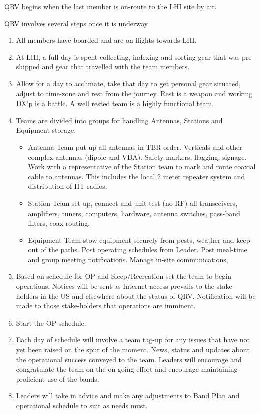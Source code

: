 \documentclass[11pt]{article}
\begin{document}
QRV begins when the last member is on-route to the LHI site by air.
\par
QRV involves several steps once it is underway
\begin{enumerate}
\item All members have boarded and are on flights towards LHI.
\item At LHI, a full day is spent collecting, indexing and sorting
gear that was pre-shipped and gear that travelled with the team members.
\item Allow for a day to acclimate, take that day to get personal gear
situated, adjust to time-zone and rest from the journey.  Rest is a weapon
and working DX'p is a battle. A well rested team is a highly functional team.
\item Teams are divided into groups for handling Antennas, Stations
and Equipment storage.
  \begin{itemize}
     \item Antenna Team put up all antennas in TBR order.  Verticals and
other complex antennas (dipole and VDA).  Safety markers, flagging, signage.
     Work with a representative of the Station team to mark and route coaxial
cable to antennas.  This includes the local 2 meter repeater system and 
distribution of HT radios.
     \item Station Team set up, connect and unit-test (no RF) all
transceivers, amplifiers, tuners, computers, hardware, antenna switches,
pass-band filters, coax routing.
     \item Equipment Team stow equipment securely from pests, weather
and keep out of the paths.  Post operating schedules from Leader.  Post
meal-time and group meeting notifications. Manage in-site communications,
\end{itemize}
\item Based on schedule for OP and Sleep/Recreation set the team to
begin operations.  Notices will be sent as Internet access prevails to
the stake-holders in the US and elsewhere about the status of QRV.  Notification
will be made to those stake-holders that operations are imminent.
\item Start the OP schedule.
\item Each day of schedule will involve a team tag-up for any issues 
that have not yet been raised on the spur of the moment.  News,
status and updates about the operational success conveyed to the team.
Leaders will encourage and congratulate the team on the on-going effort
and encourage maintaining proficient use of the bands.
\item Leaders will take in advice and make any adjustments to Band Plan
and operational schedule to suit as needs must.
\end{enumerate}
\end{document}

